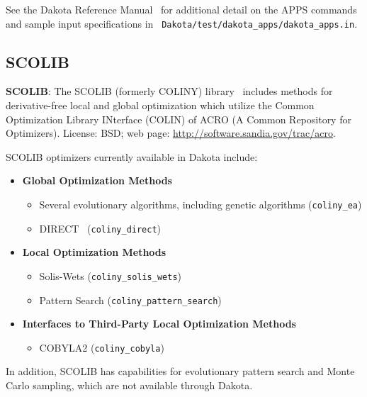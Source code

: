 See the Dakota Reference Manual~\cite{RefMan} for additional detail on
the APPS commands and sample input specifications in {\tt
Dakota/test/dakota\_apps/dakota\_apps.in}.

\subsection{SCOLIB}\label{opt:software:coliny}

\textbf{SCOLIB}: The SCOLIB (formerly COLINY) library~\cite{Har06}
includes methods for derivative-free local and global optimization
which utilize the Common Optimization Library INterface (COLIN) of
ACRO (A Common Repository for Optimizers). License: BSD; web page:
\url{http://software.sandia.gov/trac/acro}.

SCOLIB optimizers currently available in Dakota include:
\begin{itemize}

\item {\bf Global Optimization Methods}
  \begin{itemize}
  \item Several evolutionary algorithms, including genetic algorithms
    (\texttt{coliny\_ea})
  \item DIRECT~\cite{Per93} (\texttt{coliny\_direct})
  \end{itemize}

\item {\bf Local Optimization Methods}
  \begin{itemize}
  \item Solis-Wets (\texttt{coliny\_solis\_wets})
  \item Pattern Search (\texttt{coliny\_pattern\_search})
  \end{itemize}

\item {\bf Interfaces to Third-Party Local Optimization Methods}
  \begin{itemize}
  \item COBYLA2 (\texttt{coliny\_cobyla})
  \end{itemize}

\end{itemize}
In addition, SCOLIB has capabilities for evolutionary pattern search
and Monte Carlo sampling, which are not available through Dakota.

